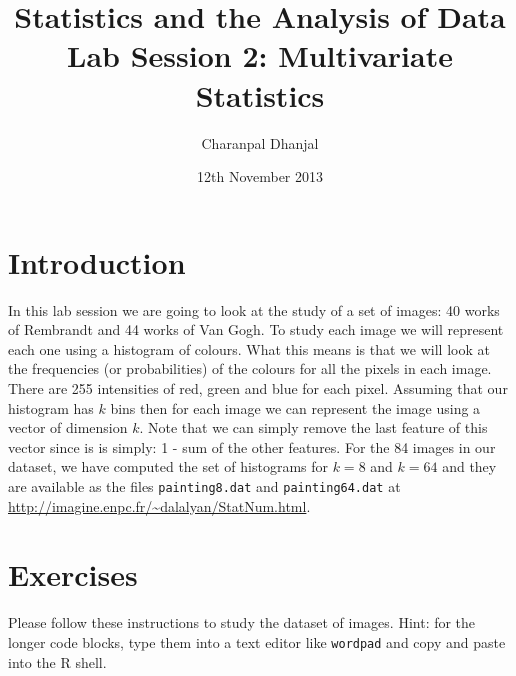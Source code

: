 \documentclass[a4paper,10pt]{article}
\title{Statistics and the Analysis of Data\\ Lab Session 2: Multivariate Statistics}
\author{Charanpal Dhanjal}
\begin{document}
\date{12th November 2013}
\maketitle

\section{Introduction} 

In this lab session we are going to look at the study of a set of images: 40 works of Rembrandt and 44 works of Van Gogh. To study each image we will represent each one using a histogram of colours. What this means is that we will look at the frequencies (or probabilities) of the colours for all the pixels in each image. There are 255 intensities of red, green and blue for each pixel. Assuming that our histogram has $k$ bins then for each image we can represent the image using a vector of dimension $k$. Note that we can simply remove the last feature of this vector since is is simply:  1 - sum of the other features. For the 84 images in our dataset, we have computed the set of histograms for $k=8$ and $k=64$ and they are available as the files \texttt{painting8.dat} and \texttt{painting64.dat} at \url{http://imagine.enpc.fr/~dalalyan/StatNum.html}. 

\section{Exercises} 

Please follow these instructions to study the dataset of images. Hint: for the longer code blocks, type them into a text editor like \texttt{wordpad} and copy and paste into the R shell.  
\end{document}
